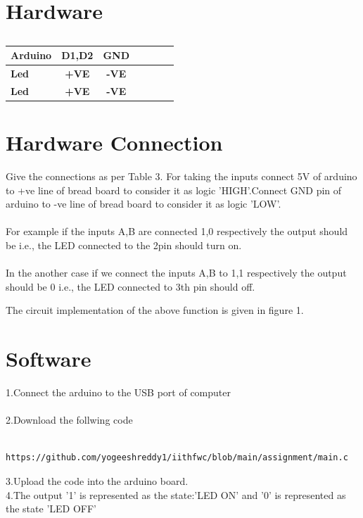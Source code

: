 \documentclass[10pt, a4paper]{article}
\begin{document}
\begin{table}[htbp]


   
    \section{Hardware}
\begin{center}
    \begin{tabular}{|l|c|c|c|c|c|c|} \hline 
 \textbf{Arduino} & \textbf{D1,D2} & \textbf{GND} \\ \hline
 \textbf{Led} & \textbf{+VE} & \textbf{-VE}\\ \hline
 \textbf{Led} & \textbf{+VE} & \textbf{-VE}\\ \hline
\end{tabular}   
\end{center}
\caption{\label{table:dummytable}}
\end{table}
   
   \section{Hardware Connection}
   Give the connections as per Table 3. For taking the inputs connect 5V of arduino to +ve line of bread board to consider it as logic 'HIGH'.Connect GND pin of arduino to -ve line of bread board to consider it as logic 'LOW'.
\\
\\
For example if the inputs A,B are connected 1,0 respectively the output should be  i.e., the LED connected to the  2pin should turn on.
\\
\\
In the another case if we connect the inputs A,B to 1,1 respectively the output should be 0 i.e., the LED connected to 3th pin should off.

  The circuit implementation of the above function is given in figure 1.
\section{Software}
  1.Connect the arduino to the USB port of computer
  \\
  \\2.Download the follwing code
  \\
  \begin{lstlisting}
   https://github.com/yogeeshreddy1/iithfwc/blob/main/assignment/main.c
  \end{lstlisting}
  
  3.Upload the code into the arduino board.
  \\4.The output '1' is represented as the state:'LED ON' and '0' is represented as the state 'LED OFF'



   
   
 
\end{document}
